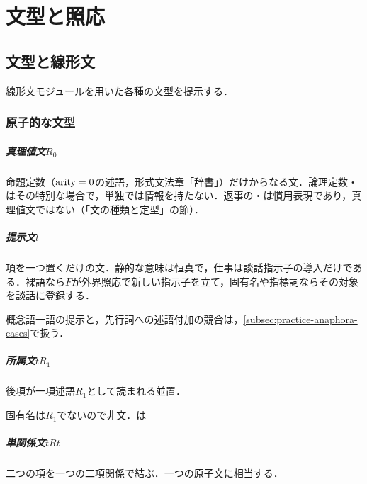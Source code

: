 \documentclass[../../main-detail.tex]{subfiles}
\begin{document}
\chapter{文型と照応}\label{chap:practice-sentences}
\section{文型と線形文}\label{sec:practice-sentence}
線形文モジュールを用いた各種の文型を提示する．

\subsection{原子的な文型}
\paragraph{真理値文$R_0$}
命題定数（$\mathop{\mathrm{arity}} = 0$の述語，形式文法章「辞書」）だけからなる文．論理定数・はその特別な場合で，単独では情報を持たない．返事の・は慣用表現であり，真理値文ではない（「文の種類と定型」の節）．

\paragraph{提示文$t$}
項を一つ置くだけの文．静的な意味は恒真で，仕事は談話指示子の導入だけである．裸語なら$F$が外界照応で新しい指示子を立て，固有名や指標詞ならその対象を談話に登録する．
\begin{exe}
    \ex {}\hfill {}
    \ex {}\hfill {}
\end{exe}
概念語一語の提示と，先行詞への述語付加の競合は，\ref{subsec:practice-anaphora-cases}で扱う．

\paragraph{所属文$tR_1$}
後項が一項述語$R_1$として読まれる並置．
\begin{exe}
    \ex {}\hfill {}
    \ex *\hfill 固有名は$R_1$でないので非文．は
\end{exe}

\paragraph{単関係文$tRt$}
二つの項を一つの二項関係で結ぶ．一つの原子文に相当する．
\begin{exe}
    \ex {}\hfill {}
    \ex {}\hfill {}
    \ex {}\hfill {}
\end{exe}
\end{document}

